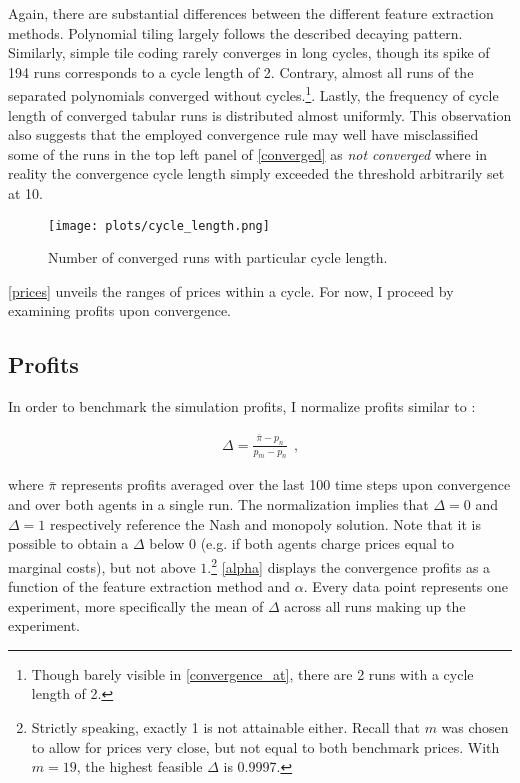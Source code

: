 Again, there are substantial differences between the different feature extraction methods. Polynomial tiling largely follows the described decaying pattern. Similarly, simple tile coding rarely converges in long cycles, though its spike of 194 runs corresponds to a cycle length of 2. Contrary, almost all runs of the separated polynomials converged without cycles.\footnote{Though barely visible in \autoref{convergence_at}, there are 2 runs with a cycle length of 2.}. Lastly, the frequency of cycle length of converged tabular runs is distributed almost uniformly. This observation also suggests that the employed convergence rule may well have misclassified some of the runs in the top left panel of \autoref{converged} as \emph{not converged} where in reality the convergence cycle length simply exceeded the threshold arbitrarily set at 10. 

\begin{figure}
	\texttt{[image: plots/cycle\_length.png]}
	\caption{Number of converged runs with particular cycle length.}
	\label{cycle_length}
\end{figure}

\autoref{prices} unveils the ranges of prices within a cycle. For now, I proceed by examining profits upon convergence.

\subsection{Profits}

In order to benchmark the simulation profits, I normalize profits similar to \textcite{calvano_algorithmic_2018}:

\begin{gather}
\Delta = \frac{\bar{\pi} - p_n}{p_m - p_n} ~~ \text{,}
\end{gather}

where $\bar{\pi}$ represents profits averaged over the last 100 time steps upon convergence and over both agents in a single run. The normalization implies that $\Delta = 0$ and $\Delta = 1$ respectively reference the Nash and monopoly solution. Note that it is possible to obtain a $\Delta$ below $0$ (e.g. if both agents charge prices equal to marginal costs), but not above $1$.\footnote{Strictly speaking, exactly 1 is not attainable either. Recall that $m$ was chosen to allow for prices very close, but not equal to both benchmark prices. With $m = 19$, the highest feasible $\Delta$ is 0.9997.} \autoref{alpha} displays the convergence profits as a function of the feature extraction method and $\alpha$. Every data point represents one experiment, more specifically the mean of $\Delta$ across all runs making up the experiment.

